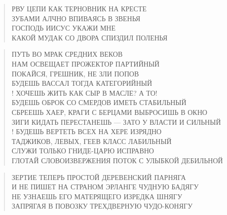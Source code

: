 \poemtitle{***}
\begin{verse}
РВУ ЦЕПИ КАК ТЕРНОВНИК НА КРЕСТЕ\\
ЗУБАМИ АЛЧНО ВПИВАЯСЬ В ЗВЕНЬЯ\\
ГОСПОДЬ ИИСУС УКАЖИ МНЕ\\
КАКОЙ МУДАК СО ДВОРА СПИЗДИЛ ПОЛЕНЬЯ
\end{verse}

\poemtitle{***}
\begin{verse}
ПУТЬ ВО МРАК СРЕДНИХ ВЕКОВ\\
НАМ ОСВЕЩАЕТ ПРОЖЕКТОР ПАРТИЙНЫЙ\\
ПОКАЙСЯ, ГРЕШНИК, НЕ ЗЛИ ПОПОВ\\
БУДЕШЬ ВАССАЛ ТОГДА КАТЕГОРИЙНЫЙ\\!
ХОЧЕШЬ ЖИТЬ КАК СЫР В МАСЛЕ? А ТО!\\
БУДЕШЬ ОБРОК СО СМЕРДОВ ИМЕТЬ СТАБИЛЬНЫЙ\\
СБРЕЕШЬ ХАЕР, КРАГИ С БЕРЦАМИ ВЫБРОСИШЬ В ОКНО\\
ЗИГИ КИДАТЬ ПЕРЕСТАНЕШЬ — ЗАТО У ВЛАСТИ И СИЛЬНЫЙ\\!
БУДЕШЬ ВЕРТЕТЬ ВСЕХ НА ХЕРЕ ИЗРЯДНО\\
ТАДЖИКОВ, ЛЕВЫХ, ГЕЕВ КЛАСС ЛАБИЛЬНЫЙ\\
СЛУЖИ ТОЛЬКО ГНИДЕ-ЦАРЮ ИСПРАВНО\\
ГЛОТАЙ СЛОВОИЗВЕРЖЕНИЯ ПОТОК С УЛЫБКОЙ ДЕБИЛЬНОЙ
\end{verse}

\poemtitle{***}
\begin{verse}
ЗЕРТИЕ ТЕПЕРЬ ПРОСТОЙ ДЕРЕВЕНСКИЙ ПАРНЯГА\\
И НЕ ПИШЕТ НА СТРАНОМ ЭРЛАНГЕ ЧУДНУЮ БАДЯГУ\\
НЕ УЗНАЕШЬ ЕГО МАТЕРЯЩЕГО ИЗРЕДКА ШНЯГУ\\
ЗАПРЯГАЯ В ПОВОЗКУ ТРЕХДВЕРНУЮ ЧУДО-КОНЯГУ
\end{verse}

